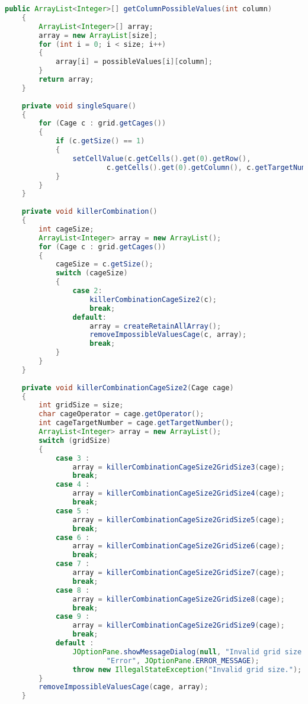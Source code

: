 \begin{lstlisting}[language=Java,basicstyle=\tiny,caption=SolverRuleBased.java]
    public ArrayList<Integer>[] getColumnPossibleValues(int column)
    {
        ArrayList<Integer>[] array;
        array = new ArrayList[size];
        for (int i = 0; i < size; i++)
        {
            array[i] = possibleValues[i][column];
        }
        return array;
    }
    
    private void singleSquare()
    {
        for (Cage c : grid.getCages())
        {
            if (c.getSize() == 1)
            {
                setCellValue(c.getCells().get(0).getRow(), 
                        c.getCells().get(0).getColumn(), c.getTargetNumber());
            }
        }
    }
    
    private void killerCombination()
    {
        int cageSize;
        ArrayList<Integer> array = new ArrayList();
        for (Cage c : grid.getCages())
        {
            cageSize = c.getSize();
            switch (cageSize)
            {
                case 2:
                    killerCombinationCageSize2(c);
                    break;
                default:
                    array = createRetainAllArray();
                    removeImpossibleValuesCage(c, array);
                    break;
            }
        }
    }
    
    private void killerCombinationCageSize2(Cage cage)
    {
        int gridSize = size;
        char cageOperator = cage.getOperator();
        int cageTargetNumber = cage.getTargetNumber();
        ArrayList<Integer> array = new ArrayList();
        switch (gridSize)
        {
            case 3 :
                array = killerCombinationCageSize2GridSize3(cage);
                break;
            case 4 :
                array = killerCombinationCageSize2GridSize4(cage);
                break;
            case 5 :
                array = killerCombinationCageSize2GridSize5(cage);
                break;
            case 6 :
                array = killerCombinationCageSize2GridSize6(cage);
                break;
            case 7 :
                array = killerCombinationCageSize2GridSize7(cage);
                break;
            case 8 :
                array = killerCombinationCageSize2GridSize8(cage);
                break;
            case 9 :
                array = killerCombinationCageSize2GridSize9(cage);
                break;
            default :
                JOptionPane.showMessageDialog(null, "Invalid grid size.", 
                        "Error", JOptionPane.ERROR_MESSAGE);
                throw new IllegalStateException("Invalid grid size.");
        }
        removeImpossibleValuesCage(cage, array);
    }


\end{lstlisting}
